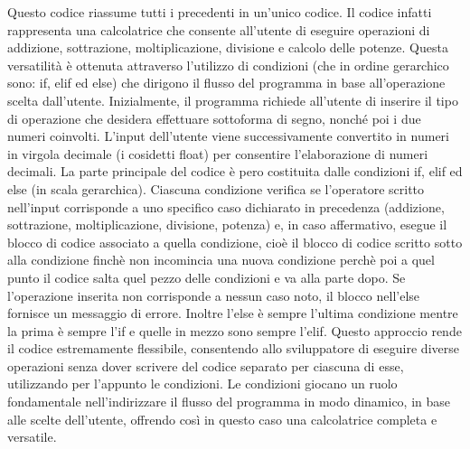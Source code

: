 \documentclass[11pt]{article}
\begin{document}
    Questo codice riassume tutti i precedenti in un'unico codice. Il codice
infatti rappresenta una calcolatrice che consente all'utente di eseguire
operazioni di addizione, sottrazione, moltiplicazione, divisione e
calcolo delle potenze. Questa versatilità è ottenuta attraverso
l'utilizzo di condizioni (che in ordine gerarchico sono: if, elif ed
else) che dirigono il flusso del programma in base all'operazione scelta
dall'utente. Inizialmente, il programma richiede all'utente di inserire
il tipo di operazione che desidera effettuare sottoforma di segno,
nonché poi i due numeri coinvolti. L'input dell'utente viene
successivamente convertito in numeri in virgola decimale (i cosidetti
float) per consentire l'elaborazione di numeri decimali. La parte
principale del codice è pero costituita dalle condizioni if, elif ed
else (in scala gerarchica). Ciascuna condizione verifica se l'operatore
scritto nell'input corrisponde a uno specifico caso dichiarato in
precedenza (addizione, sottrazione, moltiplicazione, divisione, potenza)
e, in caso affermativo, esegue il blocco di codice associato a quella
condizione, cioè il blocco di codice scritto sotto alla condizione
finchè non incomincia una nuova condizione perchè poi a quel punto il
codice salta quel pezzo delle condizioni e va alla parte dopo. Se
l'operazione inserita non corrisponde a nessun caso noto, il blocco
nell'else fornisce un messaggio di errore. Inoltre l'else è sempre
l'ultima condizione mentre la prima è sempre l'if e quelle in mezzo sono
sempre l'elif. Questo approccio rende il codice estremamente flessibile,
consentendo allo sviluppatore di eseguire diverse operazioni senza dover
scrivere del codice separato per ciascuna di esse, utilizzando per
l'appunto le condizioni. Le condizioni giocano un ruolo fondamentale
nell'indirizzare il flusso del programma in modo dinamico, in base alle
scelte dell'utente, offrendo così in questo caso una calcolatrice
completa e versatile.
\end{document}
